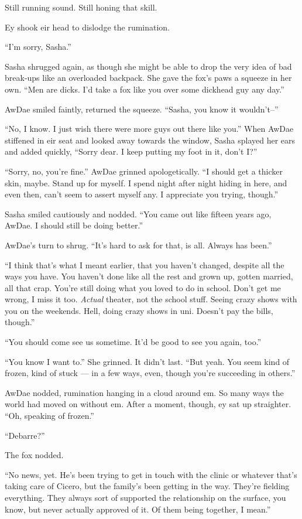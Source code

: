 Still running sound. Still honing that skill.

Ey shook eir head to dislodge the rumination.

``I'm sorry, Sasha.''

Sasha shrugged again, as though she might be able to drop the very idea of bad break-ups like an overloaded backpack. She gave the fox's paws a squeeze in her own. ``Men are dicks. I'd take a fox like you over some dickhead guy any day.''

AwDae smiled faintly, returned the squeeze. ``Sasha, you know it wouldn't--''

``No, I know. I just wish there were more guys out there like you.'' When AwDae stiffened in eir seat and looked away towards the window, Sasha splayed her ears and added quickly, ``Sorry dear. I keep putting my foot in it, don't I?''

``Sorry, no, you're fine.'' AwDae grinned apologetically. ``I should get a thicker skin, maybe. Stand up for myself. I spend night after night hiding in here, and even then, can't seem to assert myself any. I appreciate you trying, though.''

Sasha smiled cautiously and nodded. ``You came out like fifteen years ago, AwDae. I should still be doing better.''

AwDae's turn to shrug. ``It's hard to ask for that, is all. Always has been.''

``I think that's what I meant earlier, that you haven't changed, despite all the ways you have. You haven't done like all the rest and grown up, gotten married, all that crap. You're still doing what you loved to do in school. Don't get me wrong, I miss it too. \emph{Actual} theater, not the school stuff. Seeing crazy shows with you on the weekends. Hell, doing crazy shows in uni. Doesn't pay the bills, though.''

``You should come see us sometime. It'd be good to see you again, too.''

``You know I want to.'' She grinned. It didn't last. ``But yeah. You seem kind of frozen, kind of stuck — in a few ways, even, though you're succeeding in others.''

AwDae nodded, rumination hanging in a cloud around em. So many ways the world had moved on without em. After a moment, though, ey sat up straighter. ``Oh, speaking of frozen.''

``Debarre?''

The fox nodded.

``No news, yet. He's been trying to get in touch with the clinic or whatever that's taking care of Cicero, but the family's been getting in the way. They're fielding everything. They always sort of supported the relationship on the surface, you know, but never actually approved of it. Of them being together, I mean.''

